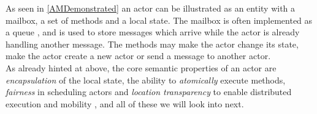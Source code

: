 As seen in \autoref{AMDemonstrated} an actor can be illustrated as an entity with a mailbox, a set of methods and a local state. The mailbox is often implemented as a queue \cite{ActorModelPaper}, and is used to store messages which arrive while the actor is already handling another message. The methods may make the actor change its state, make the actor create a new actor or send a message to another actor.\\
As already hinted at above, the core semantic properties of an actor are \textit{encapsulation} of the local state, the ability to \textit{atomically} execute methods, \textit{fairness} in scheduling actors and \textit{location transparency} to enable distributed execution and mobility \cite{ActorModelPaper}, and all of these we will look into next.
 



